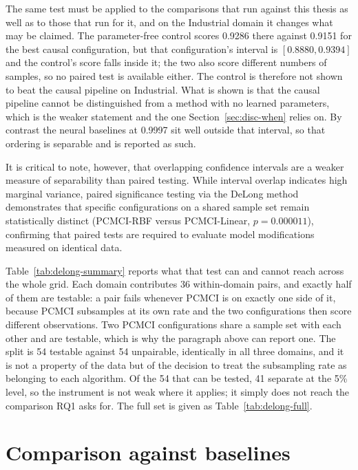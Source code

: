 The same test must be applied to the comparisons that run against this thesis as well as to those that run for it, and on the Industrial domain it changes what may be claimed. The parameter-free control scores 0.9286 there against 0.9151 for the best causal configuration, but that configuration's interval is $[0.8880, 0.9394]$ and the control's score falls inside it; the two also score different numbers of samples, so no paired test is available either. The control is therefore not shown to beat the causal pipeline on Industrial. What is shown is that the causal pipeline cannot be distinguished from a method with no learned parameters, which is the weaker statement and the one Section~\ref{sec:disc-when} relies on. By contrast the neural baselines at 0.9997 sit well outside that interval, so that ordering is separable and is reported as such.

It is critical to note, however, that overlapping confidence intervals are a weaker measure of separability than paired testing. While interval overlap indicates high marginal variance, paired significance testing via the DeLong method demonstrates that specific configurations on a shared sample set remain statistically distinct (PCMCI-RBF versus PCMCI-Linear, $p = 0.000011$), confirming that paired tests are required to evaluate model modifications measured on identical data.

Table~\ref{tab:delong-summary} reports what that test can and cannot reach across the whole grid. Each domain contributes 36 within-domain pairs, and exactly half of them are testable: a pair fails whenever PCMCI is on exactly one side of it, because PCMCI subsamples at its own rate and the two configurations then score different observations. Two PCMCI configurations share a sample set with each other and are testable, which is why the paragraph above can report one. The split is 54 testable against 54 unpairable, identically in all three domains, and it is not a property of the data but of the decision to treat the subsampling rate as belonging to each algorithm. Of the 54 that can be tested, 41 separate at the 5\% level, so the instrument is not weak where it applies; it simply does not reach the comparison RQ1 asks for. The full set is given as Table~\ref{tab:delong-full}.



\section{Comparison against baselines}
\label{sec:baselines}

